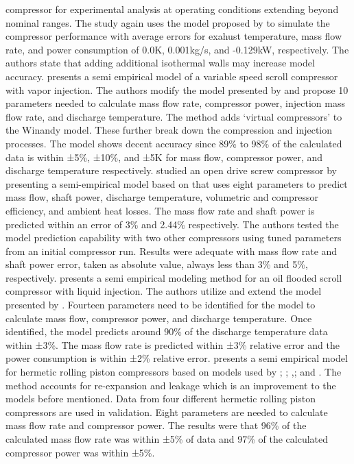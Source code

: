 \documentclass[preprint,11pt,authoryear]{elsarticle}
\begin{document}
compressor for experimental analysis at operating conditions extending beyond nominal ranges. The study again uses the model proposed by \cite{Winandy_recip} to simulate the compressor performance with average errors for exahust temperature, mass flow rate, and power consumption of 0.0K, 0.001kg/s, and -0.129kW, respectively. The authors state that adding additional isothermal walls may increase model accuracy. \cite{Dardenne2015} presents a semi empirical model of a variable speed scroll compressor with vapor injection. The authors modify the model presented by \cite{Winandy_recip} and propose 10 parameters needed to calculate mass flow rate, compressor power, injection mass flow rate, and discharge temperature. The method adds ‘virtual compressors’ to the Winandy model. These further break down the compression and injection processes. The model shows decent accuracy since 89\% to 98\% of the calculated data is within ±5\%, ±10\%, and ±5K for mass flow, compressor power, and discharge temperature respectively. \cite{Giuffrida2016} studied an open drive screw compressor by presenting a semi-empirical model based on \cite{Winandy_scr} that uses eight parameters to predict mass flow, shaft power, discharge temperature, volumetric and compressor efficiency, and ambient heat losses. The mass flow rate and shaft power is predicted within an error of 3\% and 2.44\% respectively. The authors tested the model prediction capability with two other compressors using  tuned parameters from an initial compressor run. Results were adequate with mass flow rate and shaft power error, taken as absolute value, always less than 3\% and 5\%, respectively. \cite{James2016a} presents a semi empirical modeling method for an oil flooded scroll compressor with liquid injection. The authors utilize and extend the model presented by \cite{Winandy_scr}. Fourteen parameters need to be identified for the model to calculate mass flow, compressor power, and discharge temperature. Once identified, the model predicts around 90\% of the discharge temperature data within ±3\%. The mass flow rate is predicted within ±3\% relative error and the power consumption is within ±2\% relative error. \cite{Molinaroli2017} presents a semi empirical model for hermetic rolling piston compressors based on models used by \cite{Dardenne2015}; \cite{Giuffrida2016}; \cite{Li2012},\cite{Li2012a}; and \cite{Winandy_recip}. The method accounts for re-expansion and leakage which is an improvement to the models before mentioned. Data from four different hermetic rolling piston compressors are used in validation. Eight parameters are needed to calculate mass flow rate and compressor power. The results were that 96\% of the calculated mass flow rate was within ±5\% of data and 97\% of the calculated compressor power was within ±5\%.
\end{document}

